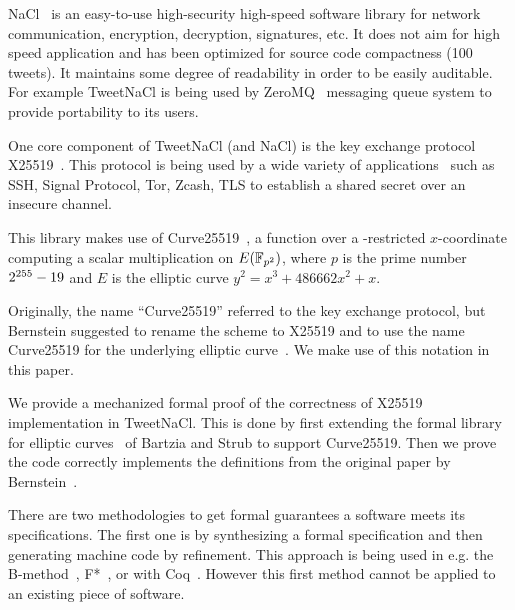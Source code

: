 NaCl~\cite{BLS12} is an easy-to-use high-security high-speed software library
for network communication, encryption, decryption, signatures, etc.
It does not aim for high speed application and has been optimized for source
code compactness (100 tweets). It maintains some degree of readability in order
to be easily auditable. For example TweetNaCl is being used by ZeroMQ~\cite{zmq}
messaging queue system to provide portability to its users.


One core component of TweetNaCl (and NaCl) is the key exchange protocol X25519~\cite{rfc7748}.
This protocol is being used by a wide variety of applications~\cite{this-that-use-curve25519}
such as SSH, Signal Protocol, Tor, Zcash, TLS to establish a shared secret over
an insecure channel.

This library makes use of Curve25519~\cite{Ber06}, a function over a -restricted
$x$-coordinate computing a scalar multiplication on $E(\mathbb{F}_{p^2})$, where $p$ is
the prime number $2^{255}-19$ and $E$ is the elliptic curve $y^2 = x^3 + 486662 x^2 + x$.

Originally, the name ``Curve25519'' referred to the key exchange protocol,
but Bernstein suggested to rename the scheme to X25519 and to use the name
Curve25519 for the underlying elliptic curve~\cite{Ber14}.
We make use of this notation in this paper.

We provide a mechanized formal proof of the correctness of X25519
implementation in TweetNaCl. This is done by first extending the formal library for
elliptic curves~\cite{DBLP:conf/itp/BartziaS14} of Bartzia and Strub to
support Curve25519. Then we prove the code correctly implements the definitions
from the original paper by Bernstein~\cite{Ber14}.

There are two methodologies to get formal guarantees a software meets its
specifications.
The first one is by synthesizing a formal specification and then generating machine
code by refinement.
This approach is being used in e.g. the B-method~\cite{Abrial:1996:BAP:236705},
F*~\cite{DBLP:journals/corr/BhargavanDFHPRR17}, or with Coq~\cite{CpdtJFR}.
However this first method cannot be applied to an existing piece of software.

